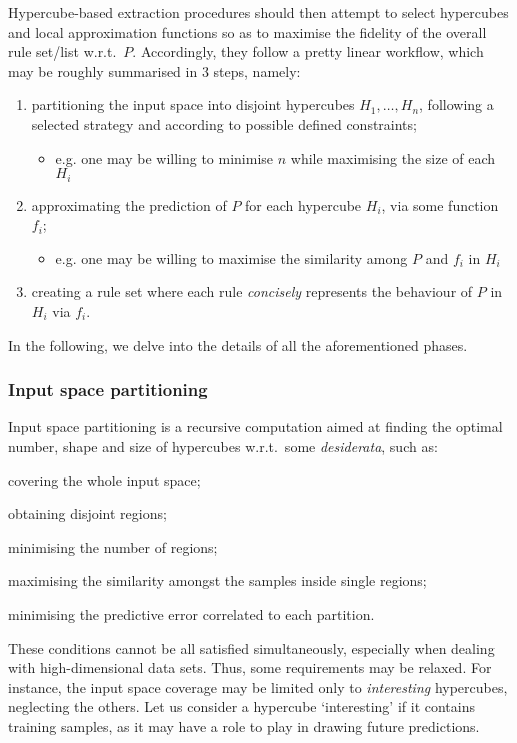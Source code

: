 \documentclass[
]{ceurart}
\begin{document}
Hypercube-based extraction procedures should then attempt to select hypercubes and local approximation functions so as to maximise the fidelity of the overall rule set/list w.r.t.\ $P$.
%
Accordingly, they follow a pretty linear workflow, which may be roughly summarised in 3 steps, namely:
%
\begin{enumerate}
	\item partitioning the input space into disjoint hypercubes $H_1, \ldots, H_n$, following a selected strategy and according to possible defined constraints;
	\begin{itemize}
		\item e.g. one may be willing to minimise $n$ while maximising the size of each $H_i$
	\end{itemize}
	\item approximating the prediction of $P$ for each hypercube $H_i$, via some function $f_i$;
	\begin{itemize}
		\item e.g. one may be willing to maximise the similarity among $P$ and $f_i$ in $H_i$
	\end{itemize}
	\item creating a rule set where each rule \emph{concisely} represents the behaviour of $P$ in $H_i$ via $f_i$.
\end{enumerate}
%
In the following, we delve into the details of all the aforementioned phases.

\subsubsection{Input space partitioning}

Input space partitioning is a recursive computation aimed at finding the optimal number, shape and size of hypercubes w.r.t.\ some \emph{desiderata}, such as:
%
\begin{inlinelist}
	\item covering the whole input space;
	\item obtaining disjoint regions;
	\item minimising the number of regions;
	\item maximising the similarity amongst the samples inside single regions;
	\item minimising the predictive error correlated to each partition.
\end{inlinelist}

These conditions cannot be all satisfied simultaneously, especially when dealing with high-dimensional data sets.
%
Thus, some requirements may be relaxed.
%
For instance, the input space coverage may be limited only to \emph{interesting} hypercubes, neglecting the others.
%
Let us consider a hypercube `interesting' if it contains training samples, as it may have a role to play in drawing future predictions.
\end{document}
